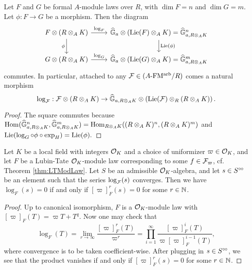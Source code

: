 \documentclass[../main.tex]{subfiles}
\begin{document}
\begin{lem}
  Let $F$ and $G$ be formal $A$-module laws over $R$, with $\dim F = n$ and
  $\dim G = m$. 
  Let $\phi: F \to G$ be a morphism. Then the diagram 
  \begin{equation*}
  \begin{tikzcd}[ampersand replacement=\&]
    {F \otimes(R \otimes_A K)} \& {\Ghat_a \otimes (\Lie(F)} \otimes_A K) =
    \Ghat_{a, R\otimes_AK}^n \\
    {G \otimes(R \otimes_A K)} \& {\Ghat_a \otimes (\Lie(G)} \otimes_A K) =
    \Ghat_{a, R\otimes_AK}^m
  	\arrow["{\log_F}", from=1-1, to=1-2]
  	\arrow["\phi"', from=1-1, to=2-1]
  	\arrow["{\Lie(\phi)}", from=1-2, to=2-2]
  	\arrow["{\log_G}", from=2-1, to=2-2]
  \end{tikzcd}
  \end{equation*}
  commutes. In particular, attached to any $\mathcal{F} \in {({A}\text-\allowbreak\mathrm{FM^{arb}}/{R})}$ comes a 
  natural morphism 
  $$\log_{\mathcal{F}}: \mathcal{F} \otimes (R \otimes_A K) \to \widehat{\mathbb{G}}_{a, R\otimes_A K} \otimes
  \left(\operatorname{Lie}(\mathcal{F}) \otimes_R (R \otimes_A K)\right).$$
  \begin{proof}
    The square commutes because $\operatorname{Hom}(\widehat{\mathbb{G}}_{a, R\otimes_AK}^n, \widehat{\mathbb{G}}_{a,
    R\otimes_AK}^m) = \operatorname{Hom}_{R \otimes_A K}((R\otimes_A K)^n, (R\otimes_A K)^m)$
    and $\operatorname{Lie}(\log_G \circ \phi \circ \exp_H) = \operatorname{Lie}(\phi).$
  \end{proof}
\end{lem}

\begin{lem}\label{lem:KernelOfLog}
  Let $K$ be a local field with integers $\mathcal{O}_K$ and a choice of uniformizer $\varpi \in \mathcal{O}_K$, 
  and let $F$ be a Lubin-Tate $\mathcal{O}_K$-module law corresponding to some 
  $f \in \mathcal{F}_\varpi$, cf. Theorem \ref{thm:LTModLaw}. Let $S$ be an admissible 
  $\mathcal{O}_K$-algebra, and let $s \in S^{\circ \hspace{-0.5pt} \circ}$ be an element such that the
  series $\log_{\mathcal{F}}(s)$ 
  converges. Then we have $\log_F(s) = 0$ if and only if $[\varpi]^r_F(s) = 0$ for
  some $r \in \mathbb{N}$. 
\begin{proof}
  Up to canonical isomorphism, $F$ is a $\mathcal{O}_K$-module law with $[\varpi]_F(T) =
  \varpi T + T^q$. Now one may check that 
  \begin{equation*}
    \log_F(T) = \lim_{r \to \infty} \frac{ [\varpi]_F^r(T) }{\varpi^r} = \prod_{i=1}^\infty 
    \frac{[\varpi]^i_F(T)}{\varpi [\varpi]^{i-1}_F(T)},
  \end{equation*}
  where convergence is to be taken coefficient-wise. After plugging in 
  $s \in S^{\circ \hspace{-0.5pt} \circ}$, we see that the product vanishes if and only if $[\varpi]_F^r(s) = 0$
  for some $r \in \mathbb{N}$. 
\end{proof}
\end{lem}
\end{document}
